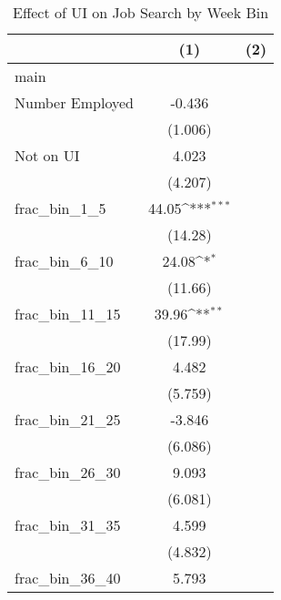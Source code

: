 \begin{table}[htbp]\centering
\def\sym#1{\ifmmode^{#1}\else\(^{#1}\)\fi}
\caption{Effect of UI on Job Search by Week Bin\label{tab:weekbins}}
\begin{tabular}{l*{2}{c}}
\hline\hline
                    &\multicolumn{1}{c}{(1)}         &\multicolumn{1}{c}{(2)}         \\
\hline
main                &                     &                     \\
Number Employed     &      -0.436         &                     \\
                    &     (1.006)         &                     \\
[1em]
Not on UI           &       4.023         &                     \\
                    &     (4.207)         &                     \\
[1em]
frac\_bin\_1\_5        &       44.05\sym{***}&                     \\
                    &     (14.28)         &                     \\
[1em]
frac\_bin\_6\_10       &       24.08\sym{*}  &                     \\
                    &     (11.66)         &                     \\
[1em]
frac\_bin\_11\_15      &       39.96\sym{**} &                     \\
                    &     (17.99)         &                     \\
[1em]
frac\_bin\_16\_20      &       4.482         &                     \\
                    &     (5.759)         &                     \\
[1em]
frac\_bin\_21\_25      &      -3.846         &                     \\
                    &     (6.086)         &                     \\
[1em]
frac\_bin\_26\_30      &       9.093         &                     \\
                    &     (6.081)         &                     \\
[1em]
frac\_bin\_31\_35      &       4.599         &                     \\
                    &     (4.832)         &                     \\
[1em]
frac\_bin\_36\_40      &       5.793         &                     \\

\end{tabular}
\end{table}
